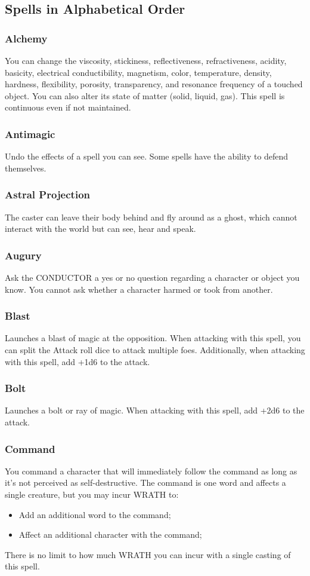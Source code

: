 \subsection{Spells in Alphabetical Order}
\begin{multicols}{3}
\subsubsection*{Alchemy}
You can change the viscosity, stickiness, reflectiveness, refractiveness, acidity, basicity, electrical conductibility, magnetism, color, temperature, density, hardness, flexibility, porosity, transparency, and resonance frequency of a touched object. You can also alter its state of matter (solid, liquid, gas). This spell is continuous even if not maintained.
\subsubsection*{Antimagic}
Undo the effects of a spell you can see. Some spells have the ability to defend themselves.
\subsubsection*{Astral Projection}
The caster can leave their body behind and fly around as a ghost, which cannot interact with the world but can see, hear and speak.
\subsubsection*{Augury}
Ask the CONDUCTOR a yes or no question regarding a character or object you know. You cannot ask whether a character harmed or took from another.
\subsubsection*{Blast}
Launches a blast of magic at the opposition. When attacking with this spell, you can split the Attack roll dice to attack multiple foes. Additionally, when attacking with this spell, add +1d6 to the attack.
\subsubsection*{Bolt}
Launches a bolt or ray of magic. When attacking with this spell, add +2d6 to the attack.
\subsubsection*{Command}
You command a character that will immediately follow the command as long as it's not perceived as self-destructive. The command is one word and affects a single creature, but you may incur WRATH to:
\begin{itemize}
    \item {Add an additional word to the command;}
    \item {Affect an additional character with the command;}
\end{itemize}
There is no limit to how much WRATH you can incur with a single casting of this spell.

\end{multicols}

